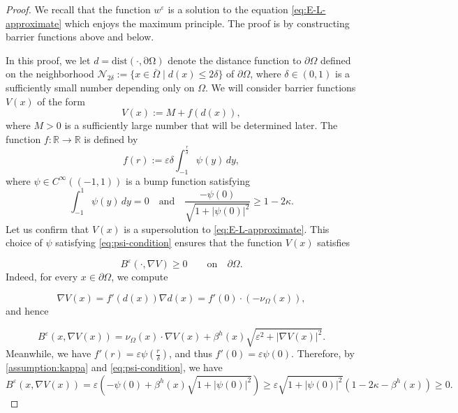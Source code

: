 \documentclass[11pt]{article}
\numberwithin{equation}{section}
\newcommand{\R}{\mathbb{R}}
\newcommand{\pOmega}[0]{\partial\Omega}
\newcommand{\closure}[1]{\overline{#1}}
\newcommand{\fix}[1]{\textcolor{red}{#1}}
\def\leq{\leqslant}
\def\geq{\geqslant}
\begin{document}


\begin{proof}
We recall that the function $w^{\varepsilon}$ is a solution to the equation \eqref{eq:E-L-approximate} which enjoys the maximum principle. The proof is by constructing barrier functions above and below.

In this proof, we let $d=\mathrm{dist(\cdot,\partial\Omega)}$ denote the distance function to $\partial\Omega$ defined on the neighborhood $\mathcal N_{2\delta} := \{x\in\closure{\Omega}\mid d(x) \leq 2\delta\}$ of $\partial\Omega$, where $\delta\in(0,1)$ is a sufficiently small number depending only on $\Omega$. We will consider barrier functions $V(x)$ of the form $$V(x) := M + f(d(x)),$$
where $M>0$ is a sufficiently large number that will be determined later. The function $f:\R\to\R$ is defined by $$f(r) := \varepsilon\delta\int_{-1}^{\frac{r}{\delta}}\psi(y)\,dy,$$ where $\psi\in C^{\infty}\left((-1,1)\right)$ is a bump function satisfying
\begin{equation}\label{eq:psi-condition}
\int_{-1}^1\psi(y)\,dy=0\quad\text{and}\quad\frac{-\psi(0)}{\sqrt{1 + |\psi(0)|^2}} \geqslant 1 - 2\kappa.
\end{equation}
Let us confirm that $V(x)$ is a supersolution to \eqref{eq:E-L-approximate}.
This choice of $\psi$ satisfying \eqref{eq:psi-condition} ensures that the function $V(x)$ satisfies

\[
B^{\varepsilon}(\cdot,\nabla V)\geq0\qquad \mbox{on}\quad \pOmega.
\]
Indeed, for every $x\in\pOmega$, we compute

\[
\nabla V(x) = f'(d(x))\nabla d(x) = f'(0)\cdot(-\nu_\Omega(x)),
\]
and hence

\[
B^\varepsilon(x,\nabla V(x)) = \nu_\Omega(x)\cdot \nabla V(x) + \beta^h(x)\sqrt{\varepsilon^2 + |\nabla V(x)|^2}.
\]
Meanwhile, we have $f'(r) = \varepsilon\psi\left(\frac{r}{\delta}\right)$, and thus $f'(0) = \varepsilon\psi(0)$. Therefore, by \eqref{assumption:kappa} and \eqref{eq:psi-condition}, we have
\[
B^\varepsilon(x,\nabla V(x)) = \varepsilon\left(- \psi(0) + \beta^h(x)\sqrt{1+|\psi(0)|^2}\right) \geq \varepsilon\sqrt{1+|\psi(0)|^2}\left(1-2\kappa-\beta^h(x)\right)\geq0.
\]




\end{proof}
\end{document}
